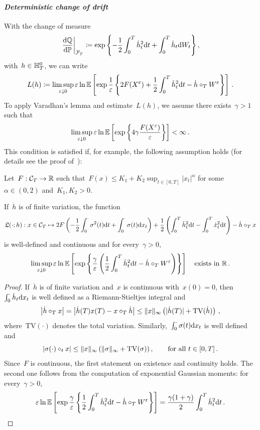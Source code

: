 \paragraph{\textit{Deterministic change of drift}}
With the change of measure
$$
\left. \frac{\mathrm{d}\mathbb{Q}}{\mathrm{d}\mathbb{P}}\right|_{\mathcal{F}_T}
 \coloneqq \exp\left\{-\frac{1}{2}\int_0^T\dot{h}_t^2 \mathrm{d} t  + \int_0^T\dot{h}_t\mathrm{d} W_t \right\},
$$
with~$h\in\mathbb{H}_T^0$, we can write
$$
L(h)\coloneqq\limsup\limits_{\varepsilon\downarrow 0} \varepsilon \ln\mathbb{E}\left[\exp\frac{1}{\varepsilon}\left\{{2F(X^{\varepsilon}) +\frac{1}{2}\int_0^T\dot{h}_t^2 \mathrm{d} t  - \dot{h}\circ_{T} W^{\varepsilon}}\right\}\right]\,.
$$
To apply Varadhan's lemma and estimate~$L(h)$, we assume there exists~$\gamma >1$ such that 
\begin{equation}\label{eq:BSAssume}
\limsup\limits_{\varepsilon\downarrow 0} \varepsilon\ln\mathbb{E}\left[
\exp\left\{4\gamma \frac{F(X^{\varepsilon})}{\varepsilon}\right\}\right] <\infty\,.
\end{equation}
This condition is satisfied if, for example, the following assumption holds (for details see the proof of~\cite[Theorem~3.6]{Guasoni2007OptimalTime}):
\begin{assumption}\label{ass:payoffGuassoni}
Let~$F:\mathcal{C}_T\rightarrow\mathbb{R}$ such that~$F(x)\leq K_{1} + K_{2} \sup_{t\in[0,T]}|x_t|^{\alpha}$ 
for some~$\alpha\in (0,2)$ and~$K_{1}, K_{2}>0$.
\end{assumption}
\begin{lemma}\label{lem:BSVaradhanCond}
If~$\dot{h}$ is of finite variation, the function
\[
\mathfrak{L}(\cdot;h):
x\in \mathcal{C}_T \mapsto 2F\left(-\frac{1}{2}\int_0^\cdot \sigma^2(t)\mathrm{d} t + \int_0^\cdot \sigma(t) \mathrm{d} x_t\right)
 + \frac{1}{2}\left(\int_0^T \dot{h}_t^2\mathrm{d} t-\int_0^T \dot{x}_t^2 \mathrm{d} t\right)
 - \dot{h}\circ_{T} x
\]
is well-defined and continuous and for every~$\gamma >0$, 
$$
\limsup\limits_{\varepsilon\downarrow 0} \varepsilon \ln\mathbb{E}\left[\exp\left\{\frac{\gamma}{\varepsilon}\left(\frac{1}{2}\int_0^T \dot{h}_t^2\mathrm{d} t
- \dot{h}\circ_{T} W^{\varepsilon}\right)\right\}\right]
\quad
\text{exists in~$\mathbb{R}$\,.}
$$
\end{lemma}
\begin{proof}
If~$\dot{h}$ is of finite variation and~$x$ is continuous with~$x(0)=0$, 
then~$\int_0^\cdot\dot{h}_t\mathrm{d} x_t$ is well defined as a Riemann-Stieltjes integral and 
$$
\left|\dot{h}\circ_{T} x\right| = \left|\dot{h}(T)x(T) - x\circ_{T} \dot{h}\right| \leq \|x\|_\infty\left(|\dot{h}(T)| + \mathrm{TV}(\dot{h})\right)\,,
$$
where~$\mathrm{TV}(\cdot)$ denotes the total variation. 
Similarly,~$\int_0^\cdot\sigma(t)\mathrm{d} x_t$ is well defined and
$$
\left|\sigma(\cdot)\circ_{t} x\right| \leq \|x\|_\infty\left(\|\sigma\|_\infty + \mathrm{TV}(\sigma)\right),
\qquad\text{for all }t \in [0,T]\,.
$$
Since~$F$ is continuous, the first statement on existence and continuity holds.
The second one follows from the computation of exponential Gaussian moments: 
for every~$\gamma >0$, 
$$
\varepsilon  \ln\mathbb{E}\left[\exp\frac{\gamma}{\varepsilon}\left\{\frac{1}{2}\int_0^T \dot{h}_t^2\mathrm{d} t
- \dot{h}\circ_{T} W^{\varepsilon}\right\}\right]
= \frac{\gamma(1+\gamma)}{2}\int_0^T\dot{h}_t^2\mathrm{d} t\,.
$$
\end{proof}
